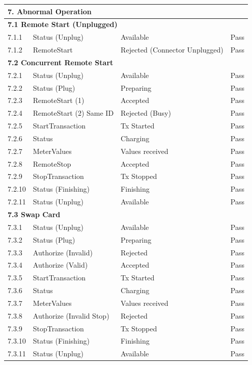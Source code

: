 \documentclass[a4paper,11pt]{report}
\begin{document}
\begin{footnotesize}
\begin{footnotesize}
\begin{longtable}{|p{1.0cm}|p{4.5cm}|p{6.5cm}|c|}
\multicolumn{4}{|l|}{\textbf{7. Abnormal Operation}} \\
\hline
\multicolumn{4}{|l|}{\textbf{7.1 Remote Start (Unplugged)}} \\
\hline
7.1.1 & Status (Unplug) & Available & Pass \\
\hline
7.1.2 & RemoteStart & Rejected (Connector Unplugged) & Pass \\
\hline

\multicolumn{4}{|l|}{\textbf{7.2 Concurrent Remote Start}} \\
\hline
7.2.1 & Status (Unplug) & Available & Pass \\
\hline
7.2.2 & Status (Plug) & Preparing & Pass \\
\hline
7.2.3 & RemoteStart (1) & Accepted & Pass \\
\hline
7.2.4 & RemoteStart (2) Same ID & Rejected (Busy) & Pass \\
\hline
7.2.5 & StartTransaction & Tx Started & Pass \\
\hline
7.2.6 & Status & Charging & Pass \\
\hline
7.2.7 & MeterValues & Values received & Pass \\
\hline
7.2.8 & RemoteStop & Accepted & Pass \\
\hline
7.2.9 & StopTransaction & Tx Stopped & Pass \\
\hline
7.2.10 & Status (Finishing) & Finishing & Pass \\
\hline
7.2.11 & Status (Unplug) & Available & Pass \\
\hline

\multicolumn{4}{|l|}{\textbf{7.3 Swap Card}} \\
\hline
7.3.1 & Status (Unplug) & Available & Pass \\
\hline
7.3.2 & Status (Plug) & Preparing & Pass \\
\hline
7.3.3 & Authorize (Invalid) & Rejected & Pass \\
\hline
7.3.4 & Authorize (Valid) & Accepted & Pass \\
\hline
7.3.5 & StartTransaction & Tx Started & Pass \\
\hline
7.3.6 & Status & Charging & Pass \\
\hline
7.3.7 & MeterValues & Values received & Pass \\
\hline
7.3.8 & Authorize (Invalid Stop) & Rejected & Pass \\
\hline
7.3.9 & StopTransaction & Tx Stopped & Pass \\
\hline
7.3.10 & Status (Finishing) & Finishing & Pass \\
\hline
7.3.11 & Status (Unplug) & Available & Pass \\
\hline


\end{longtable}
\end{footnotesize}
\end{footnotesize}
\end{document}
